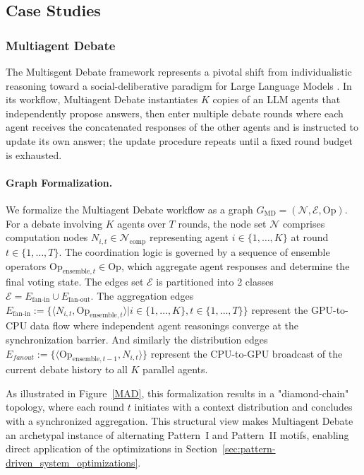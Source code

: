 \subsection{Case Studies}
\label{sec:case_study}


\subsubsection{Multiagent Debate}

The Multisgent Debate framework represents a pivotal shift from individualistic reasoning toward a social-deliberative paradigm for Large Language Models \citep{du2023improvingfactualityreasoninglanguage}. In its workflow, Multiagent Debate instantiates $K$ copies of an LLM agents that independently propose answers, then enter multiple debate rounds where each agent receives the concatenated responses of the other agents and is instructed to update its own answer; the update procedure repeats until a fixed round budget is exhausted. 

\paragraph{Graph Formalization.}

We formalize the Multiagent Debate workflow as a graph $G_\text{MD}=(\mathcal{N},\mathcal{E}, \mathrm{Op})$. For a debate involving $K$ agents over $T$ rounds, the node set $\mathcal{N}$ comprises computation nodes $N_{i,t} \in \mathcal{N}_{\text{comp}}$ representing agent $i \in \{1, \dots, K\}$ at round $t \in \{1, \dots, T\}$.  The coordination logic is governed by a sequence of ensemble operators $\text{Op}_{\text{ensemble}, t} \in \text{Op}$, which aggregate agent responses and determine the final voting state. The edges set $\mathcal{E}$ is partitioned into 2 classes $\mathcal{E} = E_\text{fan-in} \cup E_\text{fan-out}$. The aggregation edges $E_\text{fan-in} := \{\langle N_{i,t}, \mathrm{Op}_{\text{ensemble},t} \rangle | i \in \{1,\dots,K\}, t \in \{1,\dots,T\}\}$ represent the GPU-to-CPU data flow where independent agent reasonings converge at the synchronization barrier. And similarly the distribution edges $E_{fanout} := \{\langle \mathrm{Op}_{\text{ensemble}, t-1}, N_{i,t} \rangle\}$ represent the CPU-to-GPU broadcast of the current debate history to all $K$ parallel agents. 

As illustrated in Figure~\ref{MAD}, this formalization results in a "diamond-chain" topology, where each round $t$ initiates with a context distribution and concludes with a synchronized aggregation. This structural view makes Multiagent Debate an archetypal instance of alternating Pattern~I and Pattern~II motifs, enabling direct application of the optimizations in Section~\ref{sec:pattern-driven_system_optimizations}.

